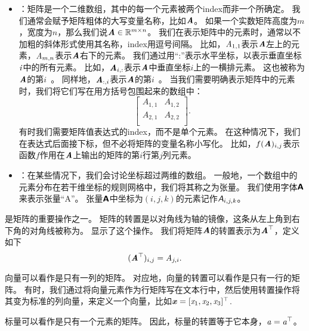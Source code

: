 \begin{itemize}
    \item {}：矩阵是一个二维数组，其中的每一个元素被两个\gls{index}而非一个所确定。
    我们通常会赋予矩阵粗体的大写变量名称，比如$\boldsymbol{\mathit{A}}$。
    如果一个实数矩阵高度为$m$，宽度为$n$，那么我们说$\boldsymbol{\mathit{A}}\in \mathbb{R}^{m\times n}$。
    我们在表示矩阵中的元素时，通常以不加粗的斜体形式使用其名称，\gls{index}用逗号间隔。
    比如，$\mathit{A}_{1,1}$表示$\boldsymbol{\mathit{A}}$左上的元素，$\mathit{A}_{m,n}$表示$\boldsymbol{\mathit{A}}$右下的元素。
    我们通过用``:''表示水平坐标，以表示垂直坐标$\mathit{i}$中的所有元素。
    比如，$\boldsymbol{\mathit{A}}_{i,:}$表示$\boldsymbol{\mathit{A}}$中垂直坐标$i$上的一横排元素。
    这也被称为$\boldsymbol{\mathit{A}}$的第$i$~。
    同样地，$\boldsymbol{\mathit{A}}_{:,i}$表示$\boldsymbol{\mathit{A}}$的第$i$~。
    当我们需要明确表示矩阵中的元素时，我们将它们写在用方括号包围起来的数组中：
    \begin{equation}
        \begin{bmatrix}
            A_{1,1} & A_{1,2} \\
            A_{2,1} & A_{2,2} \\
        \end{bmatrix}.
    \end{equation}
    有时我们需要矩阵值表达式的\gls{index}，而不是单个元素。
    在这种情况下，我们在表达式后面接下标，但不必将矩阵的变量名称小写化。
    比如，$f(\boldsymbol{\mathit{A}})_{i,j}$表示函数$f$作用在$\boldsymbol{\mathit{A}}$上输出的矩阵的第$i$行第$j$列元素。


    \item {}：在某些情况下，我们会讨论坐标超过两维的数组。
    一般地，一个数组中的元素分布在若干维坐标的规则网格中，我们将其称之为张量。
    我们使用字体$\textsf{\textbf{A}}$来表示张量``A''。
    张量$\textsf{\textbf{A}}$中坐标为$(i,j,k)$的元素记作$\textit{\textsf{A}}_{i,j,k}$。
\end{itemize}


是矩阵的重要操作之一。
矩阵的转置是以对角线为轴的镜像，这条从左上角到右下角的对角线被称为。
显示了这个操作。
我们将矩阵$\boldsymbol{\mathit{A}}$的转置表示为$\boldsymbol{\mathit{A}}^\top$，定义如下
\begin{equation}
(\boldsymbol{\mathit{A}}^\top)_{i,j}= \mathit{A}_{j,i}.
\end{equation}

向量可以看作是只有一列的矩阵。
对应地，向量的转置可以看作是只有一行的矩阵。
有时，我们通过将向量元素作为行矩阵写在文本行中，然后使用转置操作将其变为标准的列向量，来定义一个向量，比如$\boldsymbol{\mathit{x}}=[\mathit{x}_1, \mathit{x}_2, \mathit{x}_3]^\top$.


标量可以看作是只有一个元素的矩阵。
因此，标量的转置等于它本身，$\mathit{a}=\mathit{a}^\top$。


